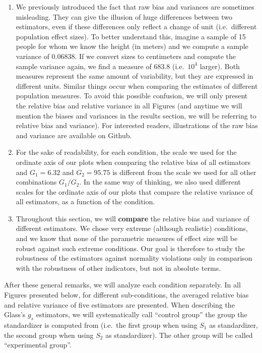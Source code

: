 \documentclass[
  english,
  man,floatsintext]{apa6}
\begin{document}
\begin{enumerate}
\def\labelenumi{\arabic{enumi})}
\item
  We previously introduced the fact that raw bias and variances are sometimes misleading. They can give the illusion of huge differences between two estimators, even if these differences only reflect a change of unit (i.e.~different population effect sizes). To better understand this, imagine a sample of 15 people for whom we know the height (in meters) and we compute a sample variance of 0.06838. If we convert sizes to centimeters and compute the sample variance again, we find a measure of 683.8 (i.e.~\(10^4\) larger). Both measures represent the same amount of variability, but they are expressed in different units. Similar things occur when comparing the estimates of different population measures. To avoid this possible confusion, we will only present the relative bias and relative variance in all Figures (and anytime we will mention the biases and variances in the results section, we will be referring to relative bias and variance). For interested readers, illustrations of the raw bias and variance are available on Github.
\item
  For the sake of readability, for each condition, the scale we used for the ordinate axis of our plots when comparing the relative bias of all estimators and \(G_1 = 6.32\) and \(G_2 = 95.75\) is different from the scale we used for all other combinations \(G_1/G_2\). In the same way of thinking, we also used different scales for the ordinate axis of our plots that compare the relative variance of all estimators, as a function of the condition.
\item
  Throughout this section, we will \textbf{compare} the relative bias and variance of different estimators. We chose very extreme (although realistic) conditions, and we know that none of the parametric measures of effect size will be robust against such extreme conditions. Our goal is therefore to study the robustness of the estimators against normality violations only in comparison with the robustness of other indicators, but not in absolute terms.
\end{enumerate}

After these general remarks, we will analyze each condition separately. In all Figures presented below, for different sub-conditions, the averaged relative bias and relative variance of five estimators are presented. When describing the Glass's \(g_s\) estimators, we will systematically call \enquote{control group} the group the standardizer is computed from (i.e.~the first group when using \(S_1\) as standardizer, the second group when using \(S_2\) as standardizer). The other group will be called \enquote{experimental group}.
\end{document}
